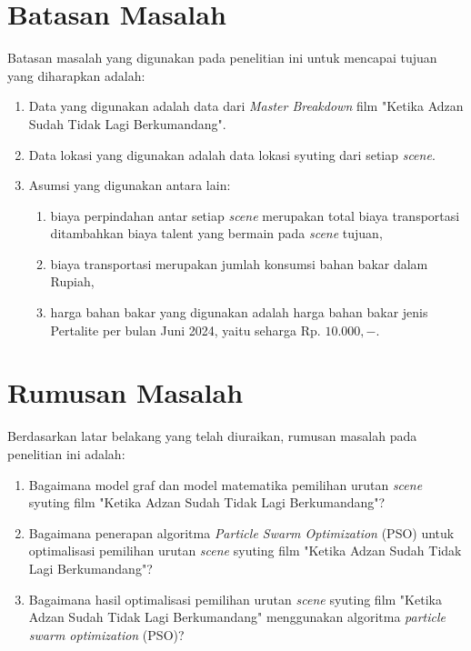 \section{Batasan Masalah}
\vspace{-4mm}
{\frenchspacing
    Batasan masalah yang digunakan pada penelitian ini untuk mencapai tujuan yang diharapkan adalah:

    \begin{enumerate}[left = 0em, align = left, nolistsep]
        \item Data yang digunakan adalah data dari \textit{Master Breakdown} film "Ketika Adzan Sudah Tidak Lagi Berkumandang".
        \item Data lokasi yang digunakan adalah data lokasi syuting dari setiap \textit{scene}.
        \item Asumsi yang digunakan antara lain:
              \begin{enumerate}[align = left, label=(\alph*), nolistsep]
                  \item biaya perpindahan antar setiap \textit{scene} merupakan total biaya transportasi ditambahkan biaya talent yang bermain pada \textit{scene} tujuan,
                  \item biaya transportasi merupakan jumlah konsumsi bahan bakar dalam Rupiah,
                  \item harga bahan bakar yang digunakan adalah harga bahan bakar jenis Pertalite per bulan Juni 2024, yaitu seharga Rp. $10.000,-$.
              \end{enumerate}
    \end{enumerate}
}
\vspace{-4mm}


\section{Rumusan Masalah}
\vspace{-4mm}
{\frenchspacing
    Berdasarkan latar belakang yang telah diuraikan, rumusan masalah pada penelitian ini adalah:

    \begin{enumerate}[left = 0em, align = left, nolistsep]
        \item Bagaimana model graf dan model matematika pemilihan urutan \textit{scene} syuting film "Ketika Adzan Sudah Tidak Lagi Berkumandang"?
        \item Bagaimana penerapan algoritma \textit{Particle Swarm Optimization} (PSO) untuk optimalisasi pemilihan urutan \textit{scene} syuting film "Ketika Adzan Sudah Tidak Lagi Berkumandang"?
        \item Bagaimana hasil optimalisasi pemilihan urutan \textit{scene} syuting film "Ketika Adzan Sudah Tidak Lagi Berkumandang" menggunakan algoritma \textit{particle swarm optimization} (PSO)?
    \end{enumerate}
}
\vspace{-4mm}


